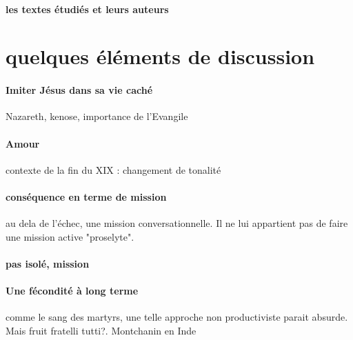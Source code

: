 \paragraph{les textes étudiés et leurs auteurs}

\section{quelques éléments de discussion}

\paragraph{Imiter Jésus dans sa vie caché} Nazareth, kenose, importance de l'Evangile



\paragraph{Amour} contexte de la fin du XIX : changement de tonalité

\paragraph{conséquence en terme de mission} au dela de l'échec, une mission conversationnelle. Il ne lui appartient pas de faire une mission active "proselyte".

\paragraph{pas isolé, mission}

\paragraph{Une fécondité à long terme} comme le sang des martyrs, une telle approche non productiviste parait absurde. Mais fruit fratelli tutti?.
Montchanin en Inde
